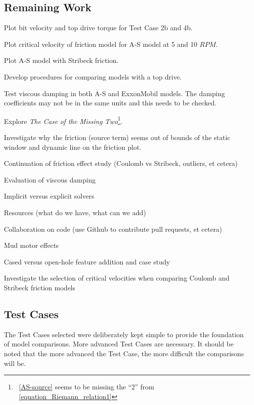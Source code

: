\subsection{Remaining Work}
\begin{bulletedlist}
	\item Plot bit velocity and top drive torque for Test Case 2b and 4b.
	\item Plot critical velocity of friction model for A-S model at 5 and 10 $RPM$.
	\item Plot A-S model with Stribeck friction.
	\item Develop procedures for comparing models with a top drive.
	\item Test viscous damping in both A-S and ExxonMobil models.  The damping coefficients may not be in the same units and this needs to be checked.
	\item Explore \emph{The Case of the Missing Two}\footnote{\equationname~\ref{AS-source} seems to be missing the ``2'' from \equationname~\ref{equation_Riemann_relation1}}.
	\item Investigate why the friction (source term) seems out of bounds of the static window and dynamic line on the friction plot.
	\item Continuation of friction effect study (Coulomb vs Stribeck, outliers, et cetera)
	\item Evaluation of viscous damping
	\item Implicit versus explicit solvers
	\item Resources (what do we have, what can we add)
	\item Collaboration on code (use Github to contribute pull requests, et cetera)
	\item Mud motor effects
	\item Cased versus open-hole feature addition and case study
	\item Investigate the selection of critical velocities when comparing Coulomb and Stribeck friction models
\end{bulletedlist}

\subsection{Test Cases}
The Test Cases selected were deliberately kept simple to provide the foundation of model comparisons.  More advanced Test Cases are necessary.  It should be noted that the more advanced the Test Case, the more difficult the comparisons will be.

